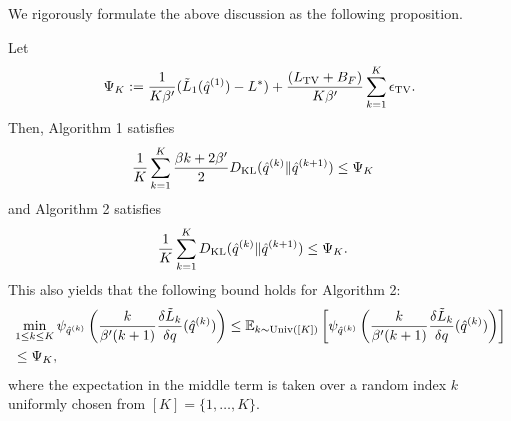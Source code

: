 We rigorously formulate the above discussion as the following proposition. 
\begin{prop}
Let $$\Psi_K := \frac{1}{K\beta'} (\tilde{L}_1(\hat{q}^{(1)})- L^*) %
+ \frac{(\LipTV +B_F)}{K\beta'} \sum_{k=1}^K \epsilon_\TV. $$
Then, Algorithm 1 satisfies  
    \begin{align}
        & \frac{1}{K} \sum_{k=1}^K \frac{\beta k + 2 \beta' }{2} D_{\mathrm{KL}}(\hat{q}^{(k)} \| \hat{q}^{(k+1)})  \leq \Psi_K 
    \end{align}
and Algorithm 2 satisfies  
    \begin{align}
        & \frac{1}{K} \sum_{k=1}^K D_{\mathrm{KL}}(\hat{q}^{(k)} \| \hat{q}^{(k+1)})  \leq     
        \Psi_K.
    \end{align}
This also yields that the following bound holds for Algorithm 2:  
    \begin{align}
        & \min_{1 \leq k \leq K} \psi_{\hat{q}^{(k)}}\left(\frac{k}{\beta' (k+1)}\frac{\delta \tilde{L}_k}{\delta q}(\hat{q}^{(k)})  \right)  \leq  
        \mathbb{E}_{k \sim \mathrm{Univ}([K])} \left[ \psi_{\hat{q}^{(k)}}\left(\frac{k}{\beta' (k+1)}\frac{\delta \tilde{L}_k}{\delta q}(\hat{q}^{(k)})  \right)   \right]  \\
        & \leq  \Psi_K,
    \end{align}
    where the expectation in the middle term is taken over a random index $k$ uniformly chosen from $[K] =\{1,\dots,K\}$. 
\end{prop}
